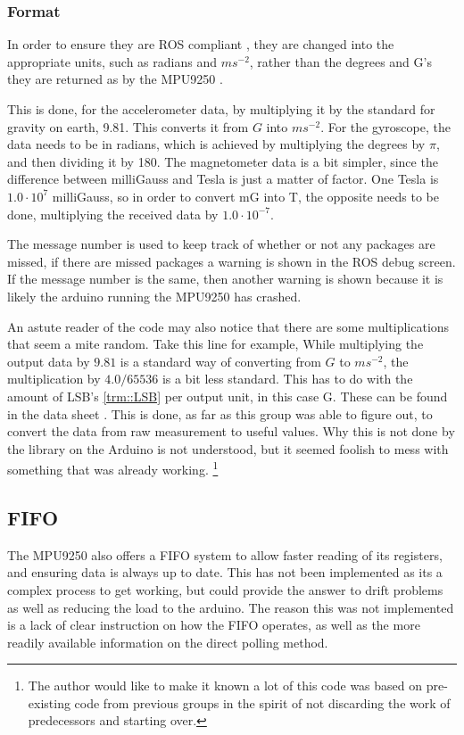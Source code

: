 \subsubsection{Format}
In order to ensure they are ROS compliant \cite{ROSformat}, they are changed into the appropriate units, such as radians and $ms^{-2}$, rather than the degrees and G's they are returned as by the MPU9250 \cite{MPU9250}.

This is done, for the accelerometer data, by multiplying it by the standard for gravity on earth, 9.81.
This converts it from $G$ into $ms^{-2}$.
For the gyroscope, the data needs to be in radians, which is achieved by multiplying the degrees by $\pi$, and then dividing it by 180.
The magnetometer data is a bit simpler, since the difference between milliGauss and Tesla is just a matter of factor.
One Tesla is $1.0 \cdot 10^{7}$ milliGauss, so in order to convert mG into T, the opposite needs to be done, multiplying the received data by  $1.0 \cdot 10^{-7}$.

The message number is used to keep track of whether or not any packages are missed, if there are missed packages a warning is shown in the ROS debug screen.
If the message number is the same, then another warning is shown because it is likely the arduino running the MPU9250 has crashed.

An astute reader of the code may also notice that there are some multiplications that seem a mite random. 
Take this line for example, 
While multiplying the output data by $9.81$ is a standard way of converting from $G$ to $ms^{-2}$, the multiplication by $4.0/65536$ is a bit less standard.
This has to do with the amount of LSB's \ref{trm::LSB} per output unit, in this case G.
These can be found in the data sheet \cite{MPU9250}.
This is done, as far as this group was able to figure out, to convert the data from raw measurement to useful values.
Why this is not done by the library on the Arduino is not understood, but it seemed foolish to mess with something that was already working.
\footnote{The author would like to make it known a lot of this code was based on pre-existing code from previous groups in the spirit of not discarding the work of predecessors and starting over.}

\subsection{FIFO}
The MPU9250 also offers a FIFO system to allow faster reading of its registers, and ensuring data is always up to date.
This has not been implemented as its a complex process to get working, but could provide the answer to drift problems as well as reducing the load to the arduino.
The reason this was not implemented is a lack of clear instruction on how the FIFO operates, as well as the more readily available information on the direct polling method.
\newpage